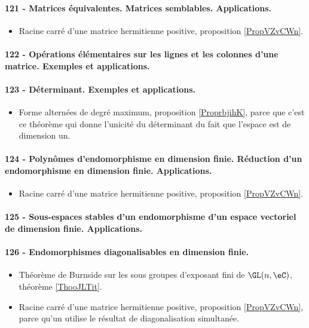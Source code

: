 \paragraph{121 - Matrices équivalentes. Matrices semblables. Applications.}
\begin{itemize}
    \item Racine carré d'une matrice hermitienne positive, proposition \ref{PropVZvCWn}.
\end{itemize}
\paragraph{122 - Opérations élémentaires sur les lignes et les colonnes d’une matrice. Exemples et applications.}
\paragraph{123 - Déterminant. Exemples et applications.}
\begin{itemize}
    \item Forme alternées de degré maximum, proposition \ref{ProprbjihK}, parce que c'est ce théorème qui donne l'unicité du déterminant du fait que l'espace est de dimension un.
\end{itemize}
\paragraph{124 - Polynômes d’endomorphisme en dimension finie. Réduction d’un endomorphisme en dimension finie. Applications.}
\begin{itemize}
    \item Racine carré d'une matrice hermitienne positive, proposition \ref{PropVZvCWn}.
\end{itemize}
\paragraph{125 - Sous-espaces stables d’un endomorphisme d’un espace vectoriel de dimension finie. Applications.}
\paragraph{126 - Endomorphismes diagonalisables en dimension finie.}
\begin{itemize}
    \item Théorème de Burnside sur les sous groupes d'exposant fini de \( \GL(n,\eC)\), théorème \ref{ThooJLTit}.
    \item Racine carré d'une matrice hermitienne positive, proposition \ref{PropVZvCWn}, parce qu'un utilise le résultat de diagonalisation simultanée.
\end{itemize}
